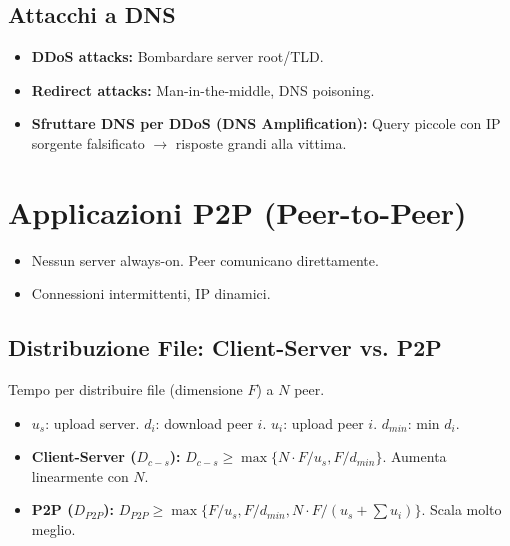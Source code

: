 \documentclass{article}
\begin{document}
\subsection{Attacchi a DNS}
\begin{itemize}
    \item \textbf{DDoS attacks:} Bombardare server root/TLD.
    \item \textbf{Redirect attacks:} Man-in-the-middle, DNS poisoning.
    \item \textbf{Sfruttare DNS per DDoS (DNS Amplification):} Query piccole con IP sorgente falsificato $\rightarrow$ risposte grandi alla vittima.
\end{itemize}

\section{Applicazioni P2P (Peer-to-Peer)}
\begin{itemize}
    \item Nessun server always-on. Peer comunicano direttamente.
    \item Connessioni intermittenti, IP dinamici.
\end{itemize}

\subsection{Distribuzione File: Client-Server vs. P2P}
Tempo per distribuire file (dimensione $F$) a $N$ peer.
\begin{itemize}
    \item $u_s$: upload server. $d_i$: download peer $i$. $u_i$: upload peer $i$. $d_{min}$: min $d_i$.
    \item \textbf{Client-Server ($D_{c-s}$):} $D_{c-s} \ge \max\{N \cdot F/u_s, F/d_{min}\}$. Aumenta linearmente con $N$.
    \item \textbf{P2P ($D_{P2P}$):} $D_{P2P} \ge \max\{F/u_s, F/d_{min}, N \cdot F/(u_s + \sum u_i)\}$. Scala molto meglio.
\end{itemize}
\end{document}
